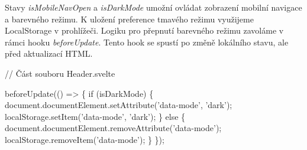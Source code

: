 Stavy \emph{isMobileNavOpen} a \emph{isDarkMode} umožní ovládat zobrazení mobilní navigace a barevného režimu. K uložení preference tmavého režimu využijeme LocalStorage v prohlížeči. 
Logiku pro přepnutí barevného režimu zavoláme v rámci hooku \emph{beforeUpdate}. Tento hook se spustí po změně lokálního stavu, ale před aktualizací HTML.

\begin{prog}
// Část souboru Header.svelte

beforeUpdate(() => \{
  if (isDarkMode) \{
    document.documentElement.setAttribute('data-mode', 'dark');
    localStorage.setItem('data-mode', 'dark');
  \} else \{
    document.documentElement.removeAttribute('data-mode');
    localStorage.removeItem('data-mode');
  \}
\});
\end{prog}